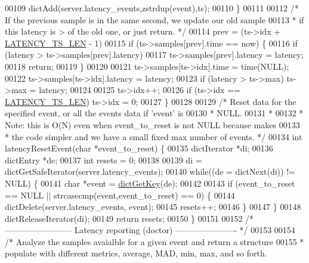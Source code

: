 \begin{DoxyCode}
00109         dictAdd(server.latency\_events,zstrdup(event),ts);
00110     \}
00111 
00112     \textcolor{comment}{/* If the previous sample is in the same second, we update our old sample}
00113 \textcolor{comment}{     * if this latency is > of the old one, or just return. */}
00114     prev = (ts->idx + \hyperlink{latency_8h_a7e3ba352d9d7bb4c88c2c42c16e6674b}{LATENCY\_TS\_LEN} - 1) %
00115     \textcolor{keywordflow}{if} (ts->samples[prev].time == now) \{
00116         \textcolor{keywordflow}{if} (latency > ts->samples[prev].latency)
00117             ts->samples[prev].latency = latency;
00118         \textcolor{keywordflow}{return};
00119     \}
00120 
00121     ts->samples[ts->idx].time = time(NULL);
00122     ts->samples[ts->idx].latency = latency;
00123     \textcolor{keywordflow}{if} (latency > ts->max) ts->max = latency;
00124 
00125     ts->idx++;
00126     \textcolor{keywordflow}{if} (ts->idx == \hyperlink{latency_8h_a7e3ba352d9d7bb4c88c2c42c16e6674b}{LATENCY\_TS\_LEN}) ts->idx = 0;
00127 \}
00128 
00129 \textcolor{comment}{/* Reset data for the specified event, or all the events data if 'event' is}
00130 \textcolor{comment}{ * NULL.}
00131 \textcolor{comment}{ *}
00132 \textcolor{comment}{ * Note: this is O(N) even when event\_to\_reset is not NULL because makes}
00133 \textcolor{comment}{ * the code simpler and we have a small fixed max number of events. */}
00134 \textcolor{keywordtype}{int} latencyResetEvent(\textcolor{keywordtype}{char} *event\_to\_reset) \{
00135     dictIterator *di;
00136     dictEntry *de;
00137     \textcolor{keywordtype}{int} resets = 0;
00138 
00139     di = dictGetSafeIterator(server.latency\_events);
00140     \textcolor{keywordflow}{while}((de = dictNext(di)) != NULL) \{
00141         \textcolor{keywordtype}{char} *event = \hyperlink{dict_8h_a3271c334309904a3086deca94f96e46e}{dictGetKey}(de);
00142 
00143         \textcolor{keywordflow}{if} (event\_to\_reset == NULL || strcasecmp(event,event\_to\_reset) == 0) \{
00144             dictDelete(server.latency\_events, event);
00145             resets++;
00146         \}
00147     \}
00148     dictReleaseIterator(di);
00149     \textcolor{keywordflow}{return} resets;
00150 \}
00151 
00152 \textcolor{comment}{/* ------------------------ Latency reporting (doctor) ---------------------- */}
00153 
00154 \textcolor{comment}{/* Analyze the samples avaialble for a given event and return a structure}
00155 \textcolor{comment}{ * populate with different metrics, average, MAD, min, max, and so forth.}

\end{DoxyCode}
